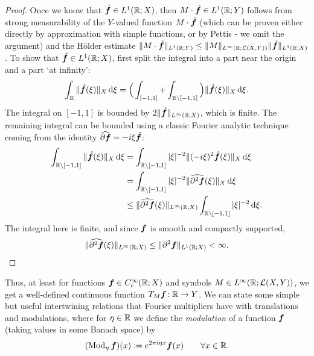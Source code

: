 \begin{proof}
  Once we know that $\hat{\bm{f}} \in L^1(\mathbb{R};X)$, then $M \cdot \hat{\bm{f}} \in L^1(\mathbb{R};Y)$ follows from strong measurability of the $Y$-valued function $M \cdot \hat{\bm{f}}$ (which can be proven either directly by approximation with simple functions, or by Pettis - we omit the argument) and the H\"older estimate $\|M \cdot \hat{\bm{f}}\|_{L^1(\mathbb{R};Y)} \leq \|M\|_{L^\infty(\mathbb{R};\mathcal{L}(X,Y))} \|\hat{\bm{f}}\|_{L^1(\mathbb{R};X)}$.
  To show that $\hat{\bm{f}} \in L^1(\mathbb{R};X)$, first split the integral into a part near the origin and a part `at infinity':
  \begin{equation*}
    \int_{\mathbb{R}} \|\hat{\bm{f}}(\xi)\|_{X} \, \mathrm{d}\xi = \Big( \int_{[-1,1]} + \int_{\mathbb{R} \setminus [-1,1]} \Big) \|\hat{\bm{f}}(\xi)\|_{X} \, \mathrm{d}\xi.
  \end{equation*}
  The integral on $[-1,1]$ is bounded by $2\|\hat{\bm{f}}\|_{L^\infty(\mathbb{R};X)}$, which is finite.
  The remaining integral can be bounded using a classic Fourier analytic technique coming from the identity $\widehat{\partial \bm{f}} = -i\xi \hat{\bm{f}}$:
  \begin{equation*}
    \begin{aligned}
    \int_{\mathbb{R} \setminus [-1,1]} \|\hat{\bm{f}}(\xi)\|_{X} \, \mathrm{d}\xi
    &= \int_{\mathbb{R} \setminus [-1,1]} |\xi|^{-2} \|(-i\xi)^{2}\hat{\bm{f}}(\xi)\|_{X} \, \mathrm{d}\xi \\
    &= \int_{\mathbb{R} \setminus [-1,1]} |\xi|^{-2} \|\widehat{\partial^{2} \bm{f}}(\xi)\|_{X} \, \mathrm{d}\xi \\
    &\leq \|\widehat{\partial^{2} \bm{f}}(\xi)\|_{L^\infty(\mathbb{R};X)} \int_{\mathbb{R} \setminus [-1,1]} |\xi|^{-2} \, \mathrm{d}\xi .
  \end{aligned}
\end{equation*}
The integral here is finite, and since $\bm{f}$ is smooth and compactly supported, 
\begin{equation*}
   \|\widehat{\partial^{2} \bm{f}}(\xi)\|_{L^\infty(\mathbb{R};X)} \leq \|\partial^{2} \bm{f}\|_{L^1(\mathbb{R};X)} < \infty.
\end{equation*}
\end{proof}

Thus, at least for functions $\bm{f} \in C_{c}^\infty(\mathbb{R};X)$ and symbols $M \in L^\infty(\mathbb{R};\mathcal{L}(X,Y))$, we get a well-defined continuous function $T_{M}\bm{f} \colon \mathbb{R} \to Y$.
We can state some simple but useful intertwining relations that Fourier multipliers have with translations and modulations, where for $\eta \in \mathbb{R}$ we define the \emph{modulation} of a function $\bm{f}$ (taking values in some Banach space) by
\begin{equation*}
  (\operatorname{Mod}_{\eta} \bm{f})(x) := e^{2\pi i \eta x} \bm{f}(x) \qquad \forall x \in \mathbb{R}.
\end{equation*}

